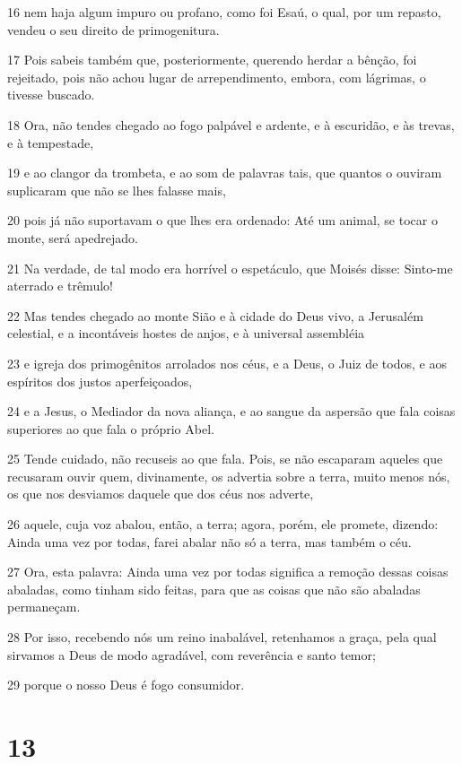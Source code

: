 \par 16 nem haja algum impuro ou profano, como foi Esaú, o qual, por um repasto, vendeu o seu direito de primogenitura.
\par 17 Pois sabeis também que, posteriormente, querendo herdar a bênção, foi rejeitado, pois não achou lugar de arrependimento, embora, com lágrimas, o tivesse buscado.
\par 18 Ora, não tendes chegado ao fogo palpável e ardente, e à escuridão, e às trevas, e à tempestade,
\par 19 e ao clangor da trombeta, e ao som de palavras tais, que quantos o ouviram suplicaram que não se lhes falasse mais,
\par 20 pois já não suportavam o que lhes era ordenado: Até um animal, se tocar o monte, será apedrejado.
\par 21 Na verdade, de tal modo era horrível o espetáculo, que Moisés disse: Sinto-me aterrado e trêmulo!
\par 22 Mas tendes chegado ao monte Sião e à cidade do Deus vivo, a Jerusalém celestial, e a incontáveis hostes de anjos, e à universal assembléia
\par 23 e igreja dos primogênitos arrolados nos céus, e a Deus, o Juiz de todos, e aos espíritos dos justos aperfeiçoados,
\par 24 e a Jesus, o Mediador da nova aliança, e ao sangue da aspersão que fala coisas superiores ao que fala o próprio Abel.
\par 25 Tende cuidado, não recuseis ao que fala. Pois, se não escaparam aqueles que recusaram ouvir quem, divinamente, os advertia sobre a terra, muito menos nós, os que nos desviamos daquele que dos céus nos adverte,
\par 26 aquele, cuja voz abalou, então, a terra; agora, porém, ele promete, dizendo: Ainda uma vez por todas, farei abalar não só a terra, mas também o céu.
\par 27 Ora, esta palavra: Ainda uma vez por todas significa a remoção dessas coisas abaladas, como tinham sido feitas, para que as coisas que não são abaladas permaneçam.
\par 28 Por isso, recebendo nós um reino inabalável, retenhamos a graça, pela qual sirvamos a Deus de modo agradável, com reverência e santo temor;
\par 29 porque o nosso Deus é fogo consumidor.

\chapter{13}

